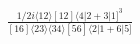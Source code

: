 \documentclass[varwidth, border=5pt]{standalone}
\begin{document}
\begin{my}
$\begin{gathered}
\scriptscriptstyle\frac{1/2i\langle12\rangle[12]\langle4|2+3|1]^3}{[16]\langle23\rangle\langle34\rangle[56]\langle2|1+6|5]}
\end{gathered}$
\end{my}
\end{document}

